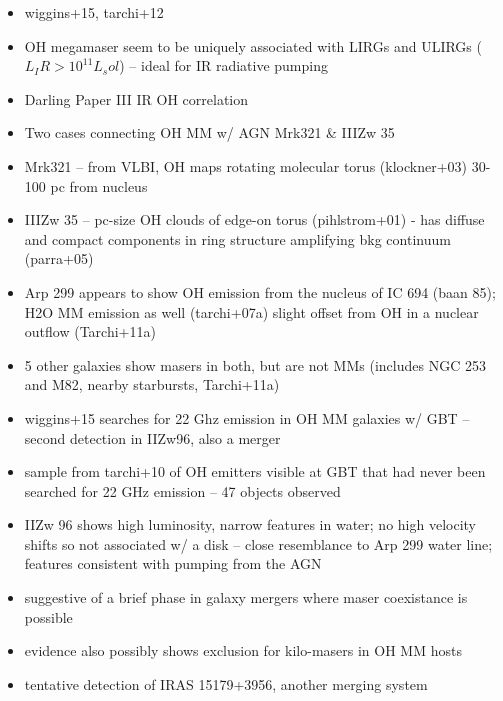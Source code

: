\begin{itemize}
\item wiggins+15, tarchi+12
\item OH megamaser seem to be uniquely associated with LIRGs and ULIRGs ($L_IR>10^11 L_sol$) -- ideal for IR radiative pumping 
\item Darling Paper III IR OH correlation
\item Two cases connecting OH MM w/ AGN Mrk321 \& IIIZw 35
\item Mrk321 -- from VLBI, OH maps rotating molecular torus (klockner+03) 30-100 pc from nucleus
\item IIIZw 35 -- pc-size OH clouds of edge-on torus (pihlstrom+01) - has diffuse and compact components in ring structure amplifying bkg continuum (parra+05)
\item Arp 299 appears to show OH emission from the nucleus of IC 694 (baan 85); H2O MM emission as well (tarchi+07a) slight offset from OH in a nuclear outflow (Tarchi+11a)
\item 5 other galaxies show masers in both, but are not MMs (includes NGC 253 and M82, nearby starbursts, Tarchi+11a)
\item wiggins+15 searches for 22 Ghz emission in OH MM galaxies w/ GBT -- second detection in IIZw96, also a merger
\item sample from tarchi+10 of OH emitters visible at GBT that had never been searched for 22 GHz emission -- 47 objects observed
\item IIZw 96 shows high luminosity, narrow features in water; no high velocity shifts so not associated w/ a disk -- close resemblance to Arp 299 water line; features consistent with pumping from the AGN
\item suggestive of a brief phase in galaxy mergers where maser coexistance is possible
\item evidence also possibly shows exclusion for kilo-masers in OH MM hosts
\item tentative detection of IRAS 15179+3956, another merging system
\end{itemize}